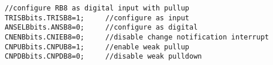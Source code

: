 \begin{lstlisting}[frame=htrbl, caption={Konfigurieren des Ports RB8 als Digitaler Input mit Pullup Widerstand}, label={lst:confregport}]
//configure RB8 as digital input with pullup
TRISBbits.TRISB8=1;     //configure as input
ANSELBbits.ANSB8=0;     //configure as digital
CNENBbits.CNIEB8=0;     //disable change notification interrupt
CNPUBbits.CNPUB8=1;     //enable weak pullup
CNPDBbits.CNPDB8=0;     //disable weak pulldown
\end{lstlisting}




